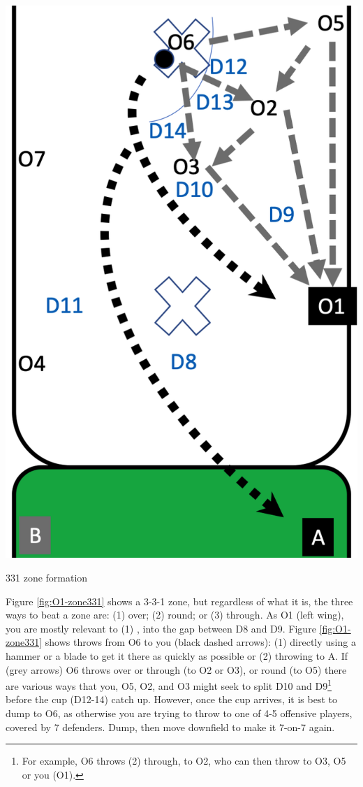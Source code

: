 \documentclass{tufte-handout}
\begin{document}
\begin{marginfigure}%
  \includegraphics[width=\linewidth]{O1-zone331}
  \caption{331 zone formation}
  \label{fig:O1-zone331}
\end{marginfigure}

Figure \ref{fig:O1-zone331}
shows a 
3-3-1 zone, but
regardless of what it is,
the three ways to beat a zone are:
(1) over;
(2) round; or
(3) through. 
As O1 
(left wing), 
you are mostly relevant to 
(1) , 
into the gap between 
D8 
and D9.
Figure \ref{fig:O1-zone331} shows 
throws from O6 to you 
(black dashed arrows):
(1) directly 
using a hammer
or a blade 
to get it there
as quickly as possible
or (2) throwing to A. 
If (grey arrows) 
O6 throws
over or through (to O2 or O3), 
or round (to O5) 
there are various ways 
that you, 
O5, 
O2, and
O3 
might seek to split
D10
and D9\footnote{
For example, 
O6 throws (2) through, 
to O2, 
who can then throw to 
O3, 
O5 
or you (O1).}
before the cup 
(D12-14) catch up. 
However, 
once the cup arrives, 
it is best to dump to O6, 
as otherwise 
you are trying to throw to 
one of 4-5 offensive players, 
covered by 7 defenders. 
Dump, 
then move downfield 
to make it 7-on-7 again.
\end{document}
